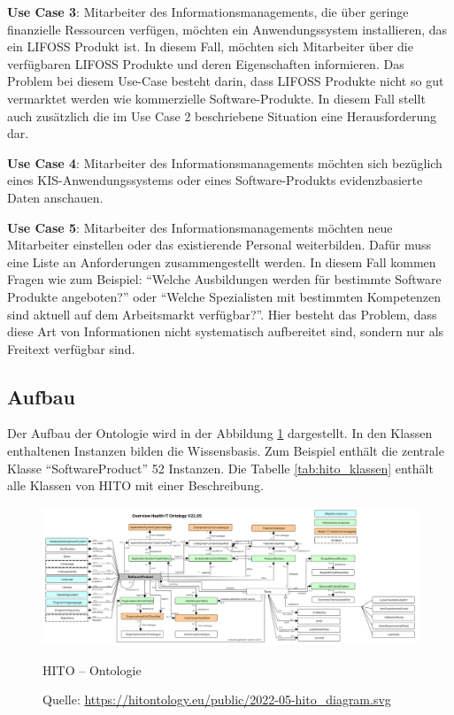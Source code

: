 \textbf{Use Case 3}: Mitarbeiter des Informationsmanagements, die über geringe finanzielle Ressourcen verfügen, möchten ein Anwendungssystem installieren, das ein \ac{LIFOSS} Produkt ist.
In diesem Fall, möchten sich Mitarbeiter über die verfügbaren \ac{LIFOSS} Produkte und deren Eigenschaften informieren.
Das Problem bei diesem Use-Case besteht darin, dass \ac{LIFOSS} Produkte nicht so gut vermarktet werden wie kommerzielle Software-Produkte. 
In diesem Fall stellt auch zusätzlich die im Use Case 2 beschriebene Situation eine Herausforderung dar. \newline

\textbf{Use Case 4}: Mitarbeiter des Informationsmanagements möchten sich bezüglich eines KIS-Anwendungssystems oder eines Software-Produkts evidenzbasierte Daten anschauen.  \newline

\textbf{Use Case 5}: Mitarbeiter des Informationsmanagements möchten neue Mitarbeiter einstellen oder das existierende Personal weiterbilden.
Dafür muss eine Liste an Anforderungen zusammengestellt werden.
In diesem Fall kommen Fragen wie zum Beispiel: \enquote{Welche Ausbildungen werden für bestimmte Software Produkte angeboten?} oder \enquote{Welche Spezialisten mit bestimmten Kompetenzen sind aktuell auf dem Arbeitsmarkt verfügbar?}.
Hier besteht das Problem, dass diese Art von Informationen nicht systematisch aufbereitet sind, sondern nur als Freitext verfügbar sind.\newline

\subsection{Aufbau}

Der Aufbau der Ontologie wird in der Abbildung \ref{fig:metamodel} dargestellt. 
In den Klassen enthaltenen Instanzen bilden die Wissensbasis.
Zum Beispiel enthält die zentrale Klasse \enquote{SoftwareProduct} 52 Instanzen.
Die Tabelle \ref{tab:hito_klassen} enthält alle Klassen von HITO mit einer Beschreibung.

\begin{figure}
    	\includegraphics[width=\textwidth]{Images/hito_metamodell}
   	\caption{HITO -- Ontologie}
	\caption*{\small Quelle: \url{https://hitontology.eu/public/2022-05-hito_diagram.svg}}
   	\label{fig:metamodel}
\end{figure}

